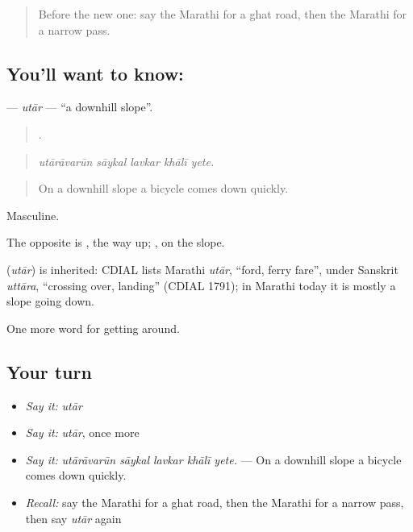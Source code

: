 \label{lesson:MR-C402-utar}



\begin{quote}
Before the new one: say the Marathi for a ghat road, then the Marathi for a narrow pass.
\end{quote}

\subsection*{You'll want to know: }
\textbf{} — \emph{utār} — \textquotedblleft{}a downhill slope\textquotedblright{}.

\begin{quote}
    .
\end{quote}

\begin{quote}
\emph{utārāvarūn sāykal lavkar khālī yete.}
\end{quote}

\begin{quote}
On a downhill slope a bicycle comes down quickly.
\end{quote}

Masculine.

The opposite is , the way up; , on the slope.

\begin{cousinweb}
\textbf{} (\emph{utār}) is inherited: CDIAL lists Marathi \emph{utār}, \textquotedblleft{}ford, ferry fare\textquotedblright{}, under Sanskrit \emph{uttāra}, \textquotedblleft{}crossing over, landing\textquotedblright{} (CDIAL 1791); in Marathi today it is mostly a slope going down.
\end{cousinweb}

\begin{grammarlens}[title={What you've built}]
One more word for getting around.
\end{grammarlens}

\subsection*{Your turn}
\begin{itemize}
\raggedright
  \item \emph{Say it:} \emph{utār}
  \item \emph{Say it:} \emph{utār}, once more
  \item \emph{Say it:} \emph{utārāvarūn sāykal lavkar khālī yete.} — On a downhill slope a bicycle comes down quickly.
  \item \emph{Recall:} say the Marathi for a ghat road, then the Marathi for a narrow pass, then say \emph{utār} again
\end{itemize}

